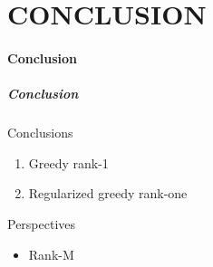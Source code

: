 \documentclass{beamer}
\begin{document}
\part{CONCLUSION}

\subsection[Conclusion]{Conclusion}
\begin{frame}
  \frametitle{Conclusion}
  \begin{block}{Conclusions}
    \begin{enumerate}
      \item Greedy rank-1
      \item Regularized greedy rank-one
    \end{enumerate}
    \end{block}
    \begin{block}{Perspectives}
    \begin{itemize}
      \item Rank-M
    \end{itemize}
  \end{block}
\end{frame}
\end{document}
